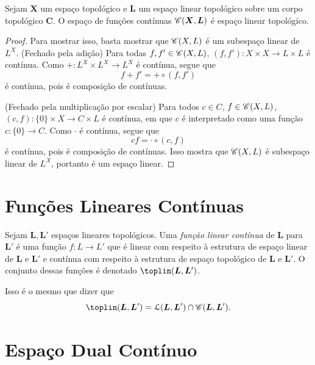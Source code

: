 \begin{prop}
Sejam $\bm X$ um espaço topológico e $\bm L$ um espaço linear topológico sobre um corpo topológico $\bm C$. O espaço de funções contínuas $\mathscr{C}(\bm X,\bm L)$ é espaço linear topológico.
\end{prop}
\begin{proof}
Para mostrar isso, basta mostrar que $\mathscr{C}(X,L)$ é um subespaço linear de $L^X$. (Fechado pela adição) Para todas $f,f' \in \mathscr{C}(X,L)$, $(f,f')\colon X \times X \to L \times L$ é contínua. Como $+\colon L^X \times L^X \to L^X$ é contínua, segue que
	\begin{equation*}
	f+f' = + \circ (f,f')
	\end{equation*}
é contínua, pois é composição de contínuas.

(Fechado pela multiplicação por escalar) Para todos $c \in C$, $f \in \mathscr{C}(X,L)$, $(c,f)\colon \{0\} \times X \to C \times L$ é contínua, em que $c$ é interpretado como uma função $c\colon \{0\} \to C$. Como $\cdot$ é contínua, segue que
	\begin{equation*}
	cf = \cdot \circ (c,f)
	\end{equation*}
é contínua, pois é composição de contínuas. Isso mostra que $\mathscr{C}(X,L)$ é subespaço linear de $L^X$, portanto é um espaço linear.
\end{proof}



\section{Funções Lineares Contínuas}

\begin{defi}
Sejam $\bm L, \bm L'$ espaços lineares topológicos. Uma \emph{função linear contínua} de $\bm L$ para $\bm L'$ é uma função $f\colon L \to L'$ que é linear com respeito à estrutura de espaço linear de $\bm L$ e $\bm L'$ e contínua com respeito à estrutura de espaço topológico de $\bm L$ e $\bm L'$. O conjunto dessas funções é denotado $\toplin (\bm L, \bm L')$.
\end{defi}

Isso é o mesmo que dizer que
	\begin{equation*}
	\toplin (\bm L, \bm L') = \lin (\bm L, \bm L') \cap \cont(\bm L, \bm L').
	\end{equation*}


\section{Espaço Dual Contínuo}

